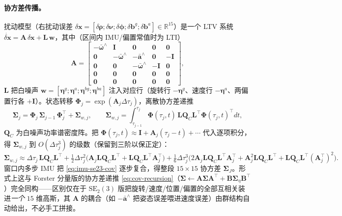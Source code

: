 \paragraph{协方差传播。}
扰动模型（右扰动误差 $\delta\mathbf x=[\delta\boldsymbol\rho;\delta\boldsymbol\nu;\delta\boldsymbol\phi;\delta\mathbf b^g;\delta\mathbf b^a]\in\mathbb R^{15}$）是一个 LTV 系统 $\dot{\delta\mathbf x}=\mathbf A\,\delta\mathbf x+\mathbf L\,\mathbf w$，其中（区间内 IMU/偏置常值时为 LTI）
\begin{equation}
  \mathbf A=\begin{bmatrix}
  -\bar{\boldsymbol\omega}^\wedge&\mathbf I&\mathbf 0&\mathbf 0&\mathbf 0\\
  \mathbf 0&-\bar{\boldsymbol\omega}^\wedge&-\bar{\mathbf a}^\wedge&\mathbf 0&-\mathbf I\\
  \mathbf 0&\mathbf 0&-\bar{\boldsymbol\omega}^\wedge&-\mathbf I&\mathbf 0\\
  \mathbf 0&\mathbf 0&\mathbf 0&\mathbf 0&\mathbf 0\\
  \mathbf 0&\mathbf 0&\mathbf 0&\mathbf 0&\mathbf 0\end{bmatrix},
  \label{eq:imu-se23-Amat}
\end{equation}
$\mathbf L$ 把白噪声 $\mathbf w=[\boldsymbol\eta^g;\boldsymbol\eta^a;\boldsymbol\eta^{bg};\boldsymbol\eta^{ba}]$ 注入对应行（旋转行 $-\boldsymbol\eta^g$、速度行 $-\boldsymbol\eta^a$、两偏置行各 $+\mathbf I$）。状态转移 $\boldsymbol\Phi_j=\exp(\mathbf A_j\Delta\tau_j)$，离散协方差递推
\begin{equation}
  \boldsymbol\Sigma_j=\boldsymbol\Phi_j\,\boldsymbol\Sigma_{j-1}\,\boldsymbol\Phi_j^\top+\boldsymbol\Sigma_{w,j},
  \qquad
  \boldsymbol\Sigma_{w,j}=\int_{\tau_{j-1}}^{\tau_j}\boldsymbol\Phi(\tau_j,t)\,\mathbf L\mathbf Q_C\mathbf L^\top\boldsymbol\Phi(\tau_j,t)^\top dt,
  \label{eq:imu-se23-cov}
\end{equation}
$\mathbf Q_C$ 为白噪声功率谱密度阵。把 $\boldsymbol\Phi(\tau_j,t)\approx\mathbf I+\mathbf A_j(\tau_j-t)+\cdots$ 代入逐项积分，得 $\boldsymbol\Sigma_{w,j}$ 到 $O(\Delta\tau_j^3)$ 的级数（保留到三阶以保正定）：
\[
  \boldsymbol\Sigma_{w,j}\approx\Delta\tau_j\,\mathbf L\mathbf Q_C\mathbf L^\top
  +\tfrac12\Delta\tau_j^2\big(\mathbf A_j\mathbf L\mathbf Q_C\mathbf L^\top+\mathbf L\mathbf Q_C\mathbf L^\top\mathbf A_j^\top\big)
  +\tfrac16\Delta\tau_j^3\big(2\mathbf A_j\mathbf L\mathbf Q_C\mathbf L^\top\mathbf A_j^\top+\mathbf A_j^2\mathbf L\mathbf Q_C\mathbf L^\top+\mathbf L\mathbf Q_C\mathbf L^\top(\mathbf A_j^\top)^2\big).
\]
窗口内多步 IMU 把 \cref{eq:imu-se23-cov} 逐步复合，得整段 $15\times15$ 协方差 $\boldsymbol\Sigma_J$。形式上这与 Forster 分量版的协方差递推 \cref{eq:cov-recursion}（$\boldsymbol\Sigma\!\leftarrow\!\mathbf A\boldsymbol\Sigma\mathbf A^\top\!+\!\mathbf B\boldsymbol\Sigma_\eta\mathbf B^\top$）完全同构——区别仅在于 $\mathrm{SE}_2(3)$ 版把旋转/速度/位置/偏置的全部互相关装进\emph{一个} $15$ 维高斯，其 $\mathbf A$ 的耦合（如 $-\bar{\mathbf a}^\wedge$ 把姿态误差喂进速度误差）由群结构自动给出，不必手工拼接。

